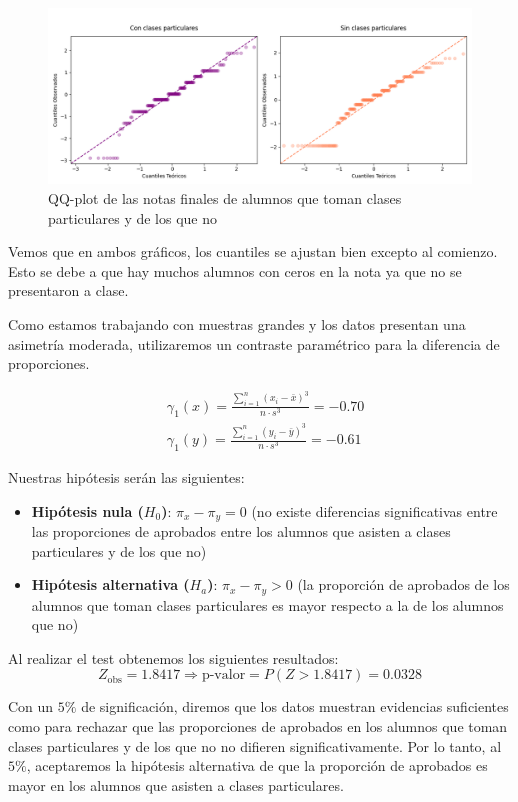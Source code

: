 \begin{figure}[H]
    \begin{center}
        \includegraphics[width=1\textwidth]{figures/qq-plot-notas-particulares.png}
    \end{center}
    \caption{QQ-plot de las notas finales de alumnos que toman clases particulares y de los que no}\label{fig:qq-plot}
\end{figure}

Vemos que en ambos gráficos, los cuantiles se ajustan bien excepto al comienzo. Esto se debe a que hay muchos alumnos con ceros en la nota ya que no se presentaron a clase. 

Como estamos trabajando con muestras grandes y los datos presentan una asimetría moderada, utilizaremos un contraste paramétrico para la diferencia de proporciones.

\begin{equation*}
    \begin{split}
        & \gamma_{1}(x) = \frac{\sum_{i=1}^{n}(x_i - \bar{x})^3}{n \cdot s^3} = -0.70\\
        & \gamma_{1}(y) = \frac{\sum_{i=1}^{n}(y_i - \bar{y})^3}{n \cdot s^3} = -0.61
    \end{split} 
\end{equation*}

Nuestras hipótesis serán las siguientes:

\begin{itemize}
    \item \textbf{Hipótesis nula ($H_0$)}: $\pi_{x} - \pi_{y} = 0$ (no existe diferencias significativas entre las proporciones de aprobados entre los alumnos que asisten a clases particulares y de los que no)
    \item \textbf{Hipótesis alternativa ($H_a$)}: $\pi_{x} - \pi_{y} > 0$ (la proporción de aprobados de los alumnos que toman clases particulares es mayor respecto a la de los alumnos que no)
\end{itemize}

Al realizar el test obtenemos los siguientes resultados:
\begin{equation*}
    Z_{\text{obs}} = 1.8417 \Rightarrow \text{p-valor} = P(Z > 1.8417) = 0.0328
\end{equation*}

Con un $5\%$ de significación, diremos que los datos muestran evidencias suficientes como para rechazar que las proporciones de aprobados en los alumnos que toman clases particulares y de los que no no difieren significativamente. Por lo tanto, al $5\%$, aceptaremos la hipótesis alternativa de que la proporción de aprobados es mayor en los alumnos que asisten a clases particulares.
